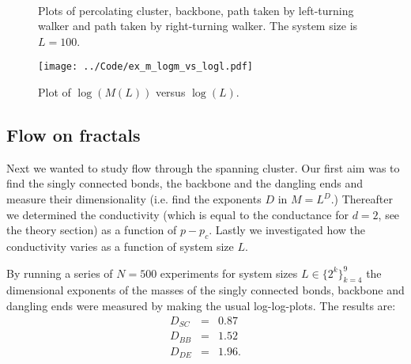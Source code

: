 \documentclass[12pt]{article}
\begin{document}
\begin{figure}[!ht]
    \begin{center}
        \hspace{5mm}
        \hspace{5mm}
        \hspace{5mm}
        \\
    \end{center}
    \caption{Plots of percolating cluster, backbone, path taken by left-turning walker and path taken by right-turning walker. The system size is $L=100$.}
    \label{fig:ex_l}
\end{figure}


\begin{figure}[!ht]
    \begin{center}
	\texttt{[image: ../Code/ex\_m\_logm\_vs\_logl.pdf]}
	\caption{Plot of $\log(M(L))$ versus $\log(L)$.}
	\label{fig:ex_m}
    \end{center}
\end{figure}



\subsection*{Flow on fractals}

Next we wanted to study flow through the spanning cluster. Our first aim was to find the singly connected bonds, the backbone and the dangling ends and measure their dimensionality (i.e. find
the exponents $D$ in $M=L^D$.)
Thereafter we determined the conductivity (which is equal to the conductance for $d=2$, see the theory section) as a function
of $p-p_c$. Lastly we investigated how the conductivity varies as a function of system size $L$.

By running a series of $N=500$ experiments for system sizes $L\in\{2^k\}_{k=4}^9$ the dimensional exponents of the masses of the singly connected bonds, backbone and dangling ends were measured
by making the usual log-log-plots. The results are:
\begin{eqnarray*}
 D_{SC} & = & 0.87 \\
 D_{BB} & = & 1.52 \\
 D_{DE} & = & 1.96. 
\end{eqnarray*}
\end{document}
